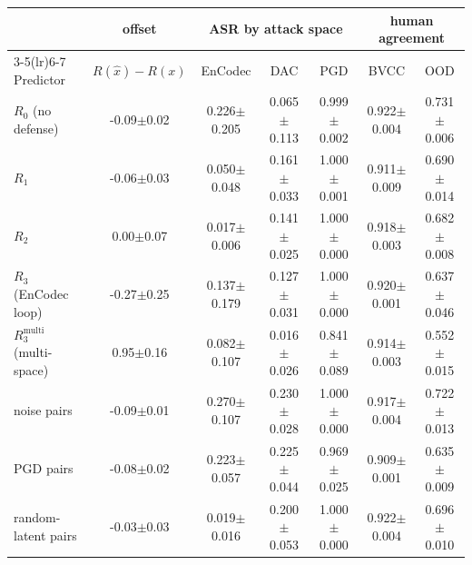 \begin{tabular}{l c c c c c c}
\toprule
& offset & \multicolumn{3}{c}{ASR by attack space} & \multicolumn{2}{c}{human agreement} \\
\cmidrule(lr){3-5}\cmidrule(lr){6-7}
Predictor & $R(\hat{x})\!-\!R(x)$ & EnCodec & DAC & PGD & BVCC & OOD \\
\midrule
$R_0$ (no defense) & -0.09$\pm$0.02 & 0.226$\pm$0.205 & 0.065$\pm$0.113 & 0.999$\pm$0.002 & 0.922$\pm$0.004 & 0.731$\pm$0.006 \\
$R_1$ & -0.06$\pm$0.03 & 0.050$\pm$0.048 & 0.161$\pm$0.033 & 1.000$\pm$0.001 & 0.911$\pm$0.009 & 0.690$\pm$0.014 \\
$R_2$ & 0.00$\pm$0.07 & 0.017$\pm$0.006 & 0.141$\pm$0.025 & 1.000$\pm$0.000 & 0.918$\pm$0.003 & 0.682$\pm$0.008 \\
$R_3$ (EnCodec loop) & -0.27$\pm$0.25 & 0.137$\pm$0.179 & 0.127$\pm$0.031 & 1.000$\pm$0.000 & 0.920$\pm$0.001 & 0.637$\pm$0.046 \\
$R_3^{\mathrm{multi}}$ (multi-space) & 0.95$\pm$0.16 & 0.082$\pm$0.107 & 0.016$\pm$0.026 & 0.841$\pm$0.089 & 0.914$\pm$0.003 & 0.552$\pm$0.015 \\
noise pairs & -0.09$\pm$0.01 & 0.270$\pm$0.107 & 0.230$\pm$0.028 & 1.000$\pm$0.000 & 0.917$\pm$0.004 & 0.722$\pm$0.013 \\
PGD pairs & -0.08$\pm$0.02 & 0.223$\pm$0.057 & 0.225$\pm$0.044 & 0.969$\pm$0.025 & 0.909$\pm$0.001 & 0.635$\pm$0.009 \\
random-latent pairs & -0.03$\pm$0.03 & 0.019$\pm$0.016 & 0.200$\pm$0.053 & 1.000$\pm$0.000 & 0.922$\pm$0.004 & 0.696$\pm$0.010 \\
\bottomrule
\end{tabular}
